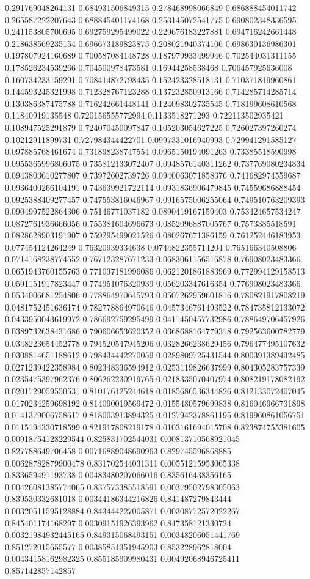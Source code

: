 \begin{table}
\begin{tabu}
\begin{sparkline}{10}
0.291769048264131 0.684931506849315 0.278468998066849 0.686888454011742 0.265587222207643 0.688845401174168 0.253145072541775 0.690802348336595 0.241153805700695 0.692759295499022 0.229676183227881 0.694716242661448 0.218638569235154 0.696673189823875 0.208021940374106 0.698630136986301 0.197807924160689 0.700587084148728 0.187979933499946 0.702544031311155 0.178526234539266 0.704500978473581 0.16944258538468 0.706457925636008 0.160734233159291 0.708414872798435 0.152423328518131 0.710371819960861 0.144593245321998 0.712328767123288 0.137232850913166 0.714285714285714 0.130386387475788 0.716242661448141 0.124098302735545 0.718199608610568 0.11840919135548 0.720156555772994 0.1133518271293 0.722113502935421 0.108947525291879 0.724070450097847 0.105203054627225 0.726027397260274 0.10212911899731 0.727984344422701 0.0997331016940993 0.729941291585127 0.097885768461674 0.731898238747554 0.0965150194091263 0.73385518590998 0.0955365996806075 0.735812133072407 0.0948576140311262 0.737769080234834 0.0943803610277807 0.73972602739726 0.0940063071858376 0.741682974559687 0.0936400266104191 0.743639921722114 0.0931836906479845 0.74559686888454 0.0925388409277457 0.747553816046967 0.0916575006255064 0.749510763209393 0.0904997522864306 0.75146771037182 0.0890419167159403 0.753424657534247 0.0872761936666056 0.755381604696673 0.0852096887005767 0.7573385518591 0.0828628903191907 0.759295499021526 0.080267671386159 0.761252446183953 0.077454124264249 0.76320939334638 0.0744822355714204 0.765166340508806 0.0714168238774552 0.767123287671233 0.0683061156516878 0.76908023483366 0.0651943760155763 0.771037181996086 0.0621201861883969 0.772994129158513 0.0591151917823447 0.774951076320939 0.056203347616354 0.776908023483366 0.0534006681254806 0.778864970645793 0.0507262959601816 0.780821917808219 0.0481752451636174 0.782778864970646 0.0457346761493522 0.784735812133072 0.0433950043619972 0.786692759295499 0.0411450457732986 0.788649706457926 0.0389732638431686 0.790606653620352 0.0368688164779318 0.792563600782779 0.0348223654452778 0.794520547945206 0.0328266238629456 0.796477495107632 0.0308814651188612 0.798434442270059 0.0289809725431544 0.800391389432485 0.0271239422358984 0.802348336594912 0.0253119826637999 0.804305283757339 0.0235475397962376 0.806262230919765 0.0218335070407974 0.808219178082192 0.0201729059550531 0.810176125244618 0.0185686536344826 0.812133072407045 0.0170234259698192 0.814090019569472 0.0155480579699838 0.816046966731898 0.0141379006758617 0.818003913894325 0.0127942378861195 0.819960861056751 0.0115194330718599 0.821917808219178 0.0103161694015708 0.823874755381605 0.00918754128229544 0.825831702544031 0.00813710568921045 0.827788649706458 0.00716889048690963 0.829745596868885 0.00628782879900478 0.831702544031311 0.00551215953065338 0.833659491193738 0.00483480207066016 0.835616438356165 0.00426081385774065 0.837573385518591 0.00379502798305063 0.839530332681018 0.00344186344216826 0.841487279843444 0.00320511595128884 0.843444227005871 0.00308772572022267 0.845401174168297 0.00309151926393962 0.847358121330724 0.00321984932445165 0.849315068493151 0.00348206051441769 0.851272015655577 0.00385851351945903 0.853228962818004 0.00434158162982325 0.855185909980431 0.00492068946725411 0.857142857142857 
\end{sparkline}
\end{tabu}
\end{table}
